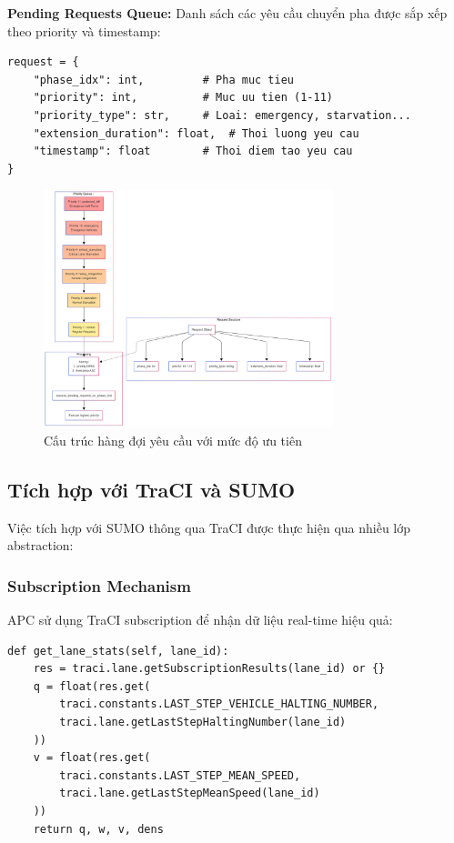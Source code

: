\textbf{Pending Requests Queue:} Danh sách các yêu cầu chuyển pha được sắp xếp theo priority và timestamp:
\begin{lstlisting}[style=py]
request = {
    "phase_idx": int,         # Pha muc tieu
    "priority": int,          # Muc uu tien (1-11)
    "priority_type": str,     # Loai: emergency, starvation...
    "extension_duration": float,  # Thoi luong yeu cau
    "timestamp": float        # Thoi diem tao yeu cau
}
\end{lstlisting}
\begin{figure}[H]
    \centering
    \includegraphics[width=0.75\textwidth]{Untitled diagram _ Mermaid Chart-2025-08-22-023041.png}
    \caption{Cấu trúc hàng đợi yêu cầu với mức độ ưu tiên}
    \label{fig:priority_queue}
\end{figure}
\subsection{Tích hợp với TraCI và SUMO}

Việc tích hợp với SUMO thông qua TraCI được thực hiện qua nhiều lớp abstraction:

\subsubsection{Subscription Mechanism}
APC sử dụng TraCI subscription để nhận dữ liệu real-time hiệu quả:

\begin{lstlisting}[style=py, caption={Xử lý subscription results}]
def get_lane_stats(self, lane_id):
    res = traci.lane.getSubscriptionResults(lane_id) or {}
    q = float(res.get(
        traci.constants.LAST_STEP_VEHICLE_HALTING_NUMBER,
        traci.lane.getLastStepHaltingNumber(lane_id)
    ))
    v = float(res.get(
        traci.constants.LAST_STEP_MEAN_SPEED,
        traci.lane.getLastStepMeanSpeed(lane_id)
    ))
    return q, w, v, dens
\end{lstlisting}

